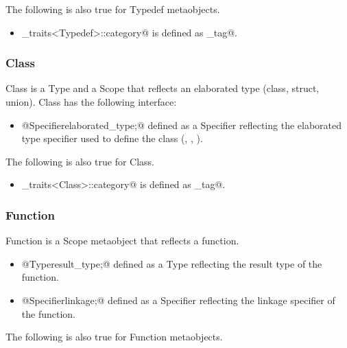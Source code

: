 The following is also true for {\metaobject Typedef} metaobjects.

\begin{itemize}
	\item \verb@metaobject_traits<Typedef>::category@ is defined as \verb@typedef_tag@.
\end{itemize}

\subsubsection{Class}

{\metaobject Class} is a {\metaobject Type} and a {\metaobject Scope} that reflects
an elaborated type (class, struct, union). {\metaobject Class} has the following interface:

\begin{itemize}
	\item{\verb@typedef @{\metaobject Specifier}\verb@ elaborated_type;@} defined as
	a {\metaobject Specifier} reflecting the elaborated type specifier used
	to define the class (\verb@class@, \verb@struct@, \verb@union@).
\end{itemize}

The following is also true for {\metaobject Class}.

\begin{itemize}
	\item \verb@metaobject_traits<Class>::category@ is defined as \verb@class_tag@.
\end{itemize}

\subsubsection{Function}

{\metaobject Function} is a {\metaobject Scope} metaobject that reflects a function.

\begin{itemize}
	\item{\verb@typedef @{\metaobject Type}\verb@ result_type;@} defined as
	a {\metaobject Type} reflecting the result type of the function.

	\item{\verb@typedef @{\metaobject Specifier}\verb@ linkage;@} defined as 
	a {\metaobject Specifier} reflecting the linkage specifier of the function.
\end{itemize}

The following is also true for {\metaobject Function} metaobjects.

